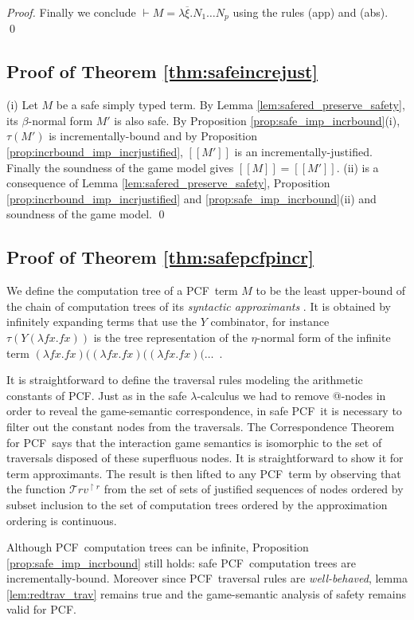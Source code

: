 \documentclass{llncs}
\newcommand\travset{\mathcal{T}rv}
\newcommand{\sem}[1]{{[\![ #1 ]\!]}}
\newcommand\pcf{\textsf{PCF}}
\begin{document}
\begin{proof}
Finally we conclude $\vdash M = \lambda \overline{\xi} . N_1 \ldots N_p$ using the
rules (app) and (abs).
\qed
\end{proof}

\subsection{Proof of Theorem \ref{thm:safeincrejust}}
(i) Let $M$ be a safe simply typed term. By Lemma \ref{lem:safered_preserve_safety}, its $\beta$-normal form $M'$ is also safe. By Proposition \ref{prop:safe_imp_incrbound}(i), $\tau(M')$ is incrementally-bound and by Proposition
\ref{prop:incrbound_imp_incrjustified}, $\sem{M'}$ is an
incrementally-justified. Finally the soundness of the game model gives $\sem{M} = \sem{M'}$.
(ii) is a consequence of Lemma \ref{lem:safered_preserve_safety},
Proposition \ref{prop:incrbound_imp_incrjustified}  and 
\ref{prop:safe_imp_incrbound}(ii) and soundness of the game model.
\qed

\subsection{Proof of Theorem \ref{thm:safepcfpincr}}

We define the computation tree of a \pcf\ term $M$ to be the least upper-bound of
the chain of computation trees of its \emph{syntactic approximants} \cite{abramsky:game-semantics-tutorial}.
It is obtained by infinitely expanding terms that use the $Y$ combinator, for instance
$\tau(Y (\lambda f x. f x))$ is
the tree representation of the $\eta$-normal form of the infinite term
$(\lambda f x. f x) ((\lambda f x. f x) ((\lambda f x. f x)  (
\ldots$\ .


It is straightforward to define the traversal rules modeling the arithmetic constants of \pcf. Just as in the safe $\lambda$-calculus we had to remove @-nodes in order to reveal the game-semantic correspondence, in safe \pcf\ it is necessary to filter out the constant nodes from the traversals. The Correspondence Theorem for \pcf\ says that the interaction game semantics is isomorphic to the set of traversals disposed of these superfluous nodes. It is straightforward to show it for term approximants. The result is then lifted to any \pcf\ term by observing that the function $\travset^{\upharpoonright r}$ from the set of sets of justified sequences of nodes ordered by subset inclusion to the set of computation trees ordered by the approximation ordering
is continuous.

Although \pcf\ computation trees can be infinite, Proposition \ref{prop:safe_imp_incrbound} still holds:
safe \pcf\ computation trees are incrementally-bound.
Moreover since \pcf\ traversal rules are \emph{well-behaved}, lemma \ref{lem:redtrav_trav} remains true and the game-semantic analysis of safety remains valid for \pcf.
\end{document}
